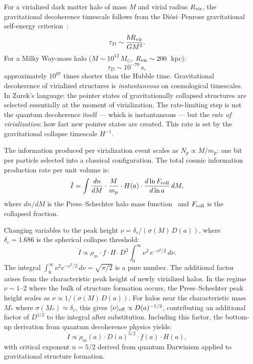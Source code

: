 \documentclass[12pt,a4paper]{article}
\begin{document}
For a virialized dark matter halo of mass $M$ and virial radius
$R_{\rm vir}$, the gravitational decoherence timescale follows from the
Diósi--Penrose gravitational self-energy criterion~\citep{Diosi1989,Penrose1996}:
\begin{equation}
\tau_D \sim \frac{\hbar R_{\rm vir}}{GM^2}.
\label{eq:tau_grav}
\end{equation}
For a Milky Way-mass halo ($M \sim 10^{12}\,M_\odot$, $R_{\rm vir} \sim
200$~kpc):
\begin{equation}
\tau_D \sim 10^{-70}~\text{s},
\end{equation}
approximately $10^{87}$ times shorter than the Hubble time. Gravitational
decoherence of virialized structures is \emph{instantaneous} on cosmological
timescales. In Zurek's language: the pointer states of gravitationally
collapsed structures are selected essentially at the moment of virialization.
The rate-limiting step is not the quantum decoherence itself --- which is
instantaneous --- but the \emph{rate of virialization}: how fast new pointer
states are created. This rate is set by the gravitational collapse timescale
$H^{-1}$.

The information produced per virialization event scales as $N_p \propto
M/m_p$: one bit per particle selected into a classical configuration. The
total cosmic information production rate per unit volume is:
\begin{equation}
\dot{I} = \int \frac{dn}{dM} \cdot \frac{M}{m_p}
\cdot H(a) \cdot \frac{d\ln F_{\rm coll}}{d\ln a}\,dM,
\label{eq:Idot_integral}
\end{equation}
where $dn/dM$ is the Press--Schechter halo mass
function~\citep{Press1974} and $F_{\rm coll}$ is the collapsed fraction.

Changing variables to the peak height $\nu = \delta_c/(\sigma(M)\,D(a))$,
where $\delta_c = 1.686$ is the spherical collapse threshold:
\begin{equation}
\dot{I} \propto \rho_m \cdot f \cdot H \cdot D^2
\int_0^\infty \nu^2\,e^{-\nu^2/2}\,d\nu.
\label{eq:Idot_nu}
\end{equation}
The integral $\int_0^\infty \nu^2 e^{-\nu^2/2}\,d\nu = \sqrt{\pi/2}$ is a
pure number. The additional factor arises from the characteristic peak height
of newly virialized halos. In the regime $\nu \sim 1$--$2$ where the bulk of
structure formation occurs, the Press--Schechter peak height scales as
$\nu \propto 1/(\sigma(M)\,D(a))$. For halos near the characteristic mass
$M_*$ where $\sigma(M_*) \simeq \delta_c$, this gives
$\langle\nu\rangle_{\rm eff} \propto D(a)^{-1/2}$, contributing an additional
factor of $D^{1/2}$ to the integral after substitution. Including this factor,
the bottom-up derivation from quantum decoherence physics yields:
\begin{equation}
\boxed{\dot{I} \propto \rho_m(a)\cdot D(a)^{5/2} \cdot f(a) \cdot H(a)},
\label{eq:Idot_bottomup}
\end{equation}
with critical exponent $n = 5/2$ derived from quantum Darwinism applied
to gravitational structure formation.
\end{document}
